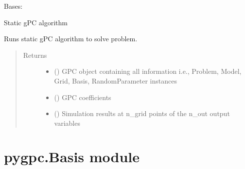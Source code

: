 \documentclass[letterpaper,10pt,english,openany,oneside]{sphinxmanual}
\begin{document}

\begin{fulllineitems}
\label{\detokenize{pygpc:pygpc.Algorithm.Static}}
Bases: {\hyperref[\detokenize{pygpc:pygpc.Algorithm.Algorithm}]{}}

Static gPC algorithm

\begin{fulllineitems}
\label{\detokenize{pygpc:pygpc.Algorithm.Static.run}}
Runs static gPC algorithm to solve problem.
\begin{quote}\begin{description}
\item[{Returns}] \leavevmode
\begin{itemize}
\item {} 
 () \textendash{} GPC object containing all information i.e., Problem, Model, Grid, Basis, RandomParameter instances

\item {} 
 () \textendash{} GPC coefficients

\item {} 
 () \textendash{} Simulation results at n\_grid points of the n\_out output variables

\end{itemize}


\end{description}\end{quote}

\end{fulllineitems}


\end{fulllineitems}



\section{pygpc.Basis module}
\label{\detokenize{pygpc:module-pygpc.Basis}}\label{\detokenize{pygpc:pygpc-basis-module}}
\end{document}
